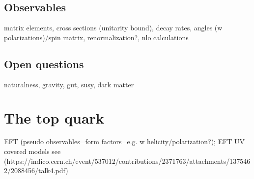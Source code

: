 \subsection{Observables}
matrix elements, cross sections (unitarity bound), decay rates, angles (w polarizations)/spin matrix, renormalization?, nlo calculations

\subsection{Open questions}
naturalness, gravity, gut, susy, dark matter

\section{The top quark}

EFT (pseudo observables=form factors=e.g. w helicity/polarization?); EFT UV covered models see (https://indico.cern.ch/event/537012/contributions/2371763/attachments/1375462/2088456/talk4.pdf)
\subsection{}
